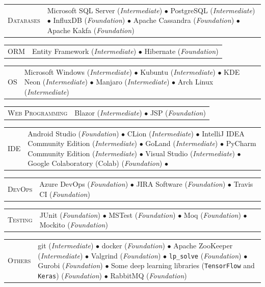 \documentclass[english,10pt,a4paper]{article}
\newcommand{\BasicLevel}{{\footnotesize (\textit{Foundation})}}
\newcommand{\MediumLevel}{{\footnotesize (\textit{Intermediate})}}
\newcommand{\CvBullet}{\hspace{0.05cm} \textcolor{CvColor}{$\bullet$} \hspace{0.05cm}}
\newcommand{\CvDate}[1]{\textcolor{CvColor}{{\textsc{#1}}}}
\def\SidebarHSize{3.5cm}
\def\BodyHSize{11cm}
\begin{document}
	\begin{longtable}{p{\SidebarHSize}p{\BodyHSize}}
		\CvDate{Databases} & Microsoft SQL Server \MediumLevel \CvBullet PostgreSQL \MediumLevel \CvBullet InfluxDB \BasicLevel \CvBullet Apache Cassandra \BasicLevel \CvBullet Apache Kakfa \BasicLevel \\
	\end{longtable}
	
	\begin{longtable}{p{\SidebarHSize}p{\BodyHSize}}
		\CvDate{ORM} & Entity Framework \MediumLevel \CvBullet Hibernate \BasicLevel
	\end{longtable}
	
	\begin{longtable}{p{\SidebarHSize}p{\BodyHSize}}
		\CvDate{OS} & Microsoft Windows \MediumLevel \CvBullet Kubuntu \MediumLevel \CvBullet KDE Neon \MediumLevel \CvBullet Manjaro \MediumLevel \CvBullet Arch Linux \MediumLevel \\
	\end{longtable}
	
	\begin{longtable}{p{\SidebarHSize}p{\BodyHSize}}
		\CvDate{Web Programming} & Blazor \MediumLevel \CvBullet JSP \BasicLevel \\
	\end{longtable}
	
	\begin{longtable}{p{\SidebarHSize}p{\BodyHSize}}
		\CvDate{IDE} & Android Studio \BasicLevel \CvBullet CLion \MediumLevel \CvBullet IntelliJ IDEA Community Edition \MediumLevel \CvBullet GoLand \MediumLevel \CvBullet PyCharm Community Edition \MediumLevel \CvBullet Visual Studio \MediumLevel \CvBullet Google Colaboratory (Colab) \BasicLevel \CvBullet \\
	\end{longtable}
	
	\begin{longtable}{p{\SidebarHSize}p{\BodyHSize}}
		\CvDate{DevOps} & Azure DevOps \BasicLevel \CvBullet JIRA Software \BasicLevel \CvBullet Travis CI \BasicLevel \\
	\end{longtable}
	
	\begin{longtable}{p{\SidebarHSize}p{\BodyHSize}}
		\CvDate{Testing} & JUnit \BasicLevel \CvBullet MSTest \BasicLevel \CvBullet Moq \BasicLevel \CvBullet Mockito \BasicLevel
	\end{longtable}
	
	\begin{longtable}{p{\SidebarHSize}p{\BodyHSize}}
		\CvDate{Others} & git \MediumLevel \CvBullet docker \BasicLevel \CvBullet Apache ZooKeeper \MediumLevel \CvBullet Valgrind \BasicLevel \CvBullet \texttt{lp\_solve} \BasicLevel \CvBullet  Gurobi \BasicLevel \CvBullet Some deep learning libraries (\texttt{TensorFlow} and \texttt{Keras}) \BasicLevel \CvBullet RabbitMQ \BasicLevel \\
	\end{longtable}
	
\end{document}
